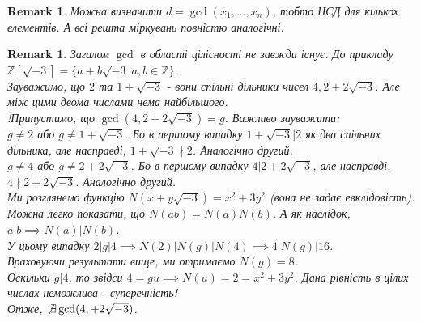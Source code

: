 \documentclass[a4paper, 14pt]{extarticle}
\theoremstyle{theoremdd}
\theoremstyle{theoremdd}
\theoremstyle{theoremdd}
\theoremstyle{theoremdd}
\theoremstyle{theoremdd}
\theoremstyle{theoremdd}
\newtheorem{remark}[theorem]{Remark}
\theoremstyle{theoremdd}
\theoremstyle{theoremdd}
\begin{document}
\begin{remark}
Можна визначити $d = \gcd(x_1,\dots,x_n)$, тобто НСД для кількох елементів. А всі решта міркувань повністю аналогічні.
\end{remark}

\begin{remark}
Загалом $\gcd$ в області цілісності не завжди існує. До прикладу $\mathbb{Z}[\sqrt{-3}] = \{a + b \sqrt{-3} | a,b \in \mathbb{Z}\}$.\\
Зауважимо, що $2$ та $1+\sqrt{-3}$ - вони спільні дільники чисел $4,2+2 \sqrt{-3}$. Але між цими двома числами нема найбільшого.\\
!Припустимо, що $\gcd(4,2+2\sqrt{-3}) = g$. Важливо зауважити:\\
$g \neq 2$ або $g \neq 1+\sqrt{-3}$. Бо в першому випадку $1+\sqrt{-3} | 2$ як два спільних дільника, але насправді, $1+\sqrt{-3} \nmid 2$. Аналогічно другий.\\
$g \neq 4$ або $g \neq 2+2\sqrt{-3}$. Бо в першому випадку $4 | 2+2\sqrt{-3}$, але насправді, $4 \nmid 2+2\sqrt{-3}$. Аналогічно другий.\\
Ми розглянемо функцію $N(x+y\sqrt{-3}) = x^2+3y^2$ (вона не задає евклідовість). Можна легко показати, що $N(ab) = N(a)N(b)$. А як наслідок, $a | b \implies N(a) | N(b)$.\\
У цьому випадку $2 | g | 4 \implies N(2) | N(g) | N(4) \implies 4 | N(g) | 16$.\\
Враховуючи результати вище, ми отримаємо $N(g) = 8$.\\
Оскільки $g | 4$, то звідси $4 = gu \implies N(u) = 2 = x^2+3y^2$. Дана рівність в цілих числах неможлива - суперечність!\\
Отже, $\not\exists \gcd(4,  +2\sqrt{-3})$.
\iffalse
Маємо $2 | g | 4$. Тоді звідси $4 = gx, g = 2y \implies 4 = 2xy \implies 2 = xy$.\\
Позначимо $x=a+b\sqrt{-3}$ та $y=c+d\sqrt{-3}$, тоді звідси\\
$2 = (ac-3bd) + \sqrt{-3}(ad+bc) \implies \begin{cases} ac-3bd = 2 \\ ad+bc = 0 \end{cases}$.\\
Можна зауважити, що $d \neq 0$, бо там буде неважка суперечність. Тому домножимо на $d$ перше - отримаємо:\\
$-bc^2 - 3bd^2 = 2d$\fi
\end{remark}
\end{document}
